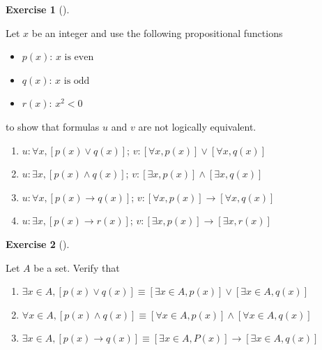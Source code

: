 \documentclass[
  letterpaper,
  10pt,
  reqno,
  twopage,
  openany]{book}
\providecommand{\tightlist}{%
  \setlength{\itemsep}{0pt}\setlength{\parskip}{0pt}}\usepackage{longtable,booktabs,array}
\theoremstyle{plain}
\theoremstyle{definition}
\newtheorem{exercise}{Exercise}[chapter]
\theoremstyle{definition}
\theoremstyle{definition}
\theoremstyle{plain}
\theoremstyle{plain}
\theoremstyle{remark}
\begin{document}
\leavevmode{}%
\begin{exercise}[]\label{exr-show-logically-equivalent}

Let \(x\) be an integer and use the following propositional functions

\begin{itemize}
\tightlist
\item
  \(p(x)\): \(x \text{ is even }\)
\item
  \(q(x)\): \(x \text{ is odd }\)
\item
  \(r(x)\): \(x^2<0\)
\end{itemize}

to show that formulas \(u\) and \(v\) are not logically equivalent.

\begin{enumerate}
\def\labelenumi{\arabic{enumi}.}
\tightlist
\item
  \(u: \forall x, [p(x)\lor q(x)]\);
  \quad \(v: [\forall x, p(x)] \lor [\forall x, q(x)]\)
\item
  \(u: \exists x, [p(x)\land q(x)]\);
  \quad \(v: [\exists x, p(x)] \land [\exists x, q(x)]\)
\item
  \(u: \forall x, [p(x)\rightarrow q(x)]\);
  \quad \(v: [\forall x, p(x)] \rightarrow [\forall x, q(x)]\)
\item
  \(u: \exists x, [p(x)\rightarrow r(x)]\);
  \quad \(v: [\exists x, p(x)] \rightarrow [\exists x, r(x)]\)
\end{enumerate}

\end{exercise}

\leavevmode{}%
\begin{exercise}[]\label{exr-verify-equiv}

Let \(A\) be a set. Verify that

\begin{enumerate}
\def\labelenumi{\arabic{enumi}.}
\tightlist
\item
  \(\exists x\in A,[p(x)\lor q(x)]\equiv [\exists x\in A, p(x)]\lor [\exists x\in A, q(x)]\)
\item
  \(\forall x\in A,[p(x)\land q(x)]\equiv [\forall x\in A, p(x)]\land [\forall x\in A, q(x)]\)
\item
  \(\exists x\in A,[p(x)\rightarrow q(x)]\equiv [\exists x\in A, P(x)]\rightarrow [\exists x\in A, q(x)]\)
\end{enumerate}

\end{exercise}
\end{document}

